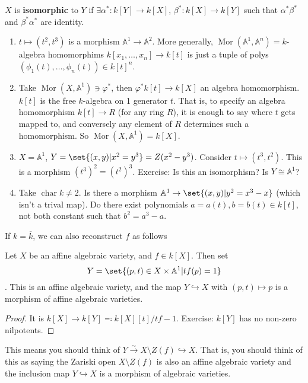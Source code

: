 \documentclass{article}
\newcommand{\A}{\mathbb{A}}
\DeclareMathOperator{\chara}{char}
\DeclareMathOperator{\Mor}{Mor}
\begin{document}
\begin{defi}[Isomorphic]
    $X$ is \textbf{isomorphic} to $Y$ if $\exists \alpha^*: k[Y] \to k[X]$, $\beta^*: k[X] \to k[Y]$ such that $\alpha^* \beta^*$ and $\beta^* \alpha^*$ are identity.
\end{defi}
\begin{eg}
    \begin{enumerate}[label=(\roman*)]
        \item $t \mapsto (t^2, t^3)$ is a morphism $\A^1 \to \A^2$.
            More generally, $\Mor(\A^1, \A^n) = k$-algebra homomorphims $k[x_1, \dotsc, x_n] \to k[t]$ is just a tuple of polys $(\phi_1(t), \dotsc, \phi_n(t)) \in k[t]^n$.
        \item Take $\Mor(X, \A^1) \ni \varphi^*$, then $\varphi^* k[t] \to k[X]$ an algebra homomorphism. $k[t]$ is the free $k$-algebra on 1 generator $t$.
            That is, to specify an algebra homomorphism $k[t] \to R$ (for any ring $R$), it is enough to say where $t$ gets mapped to, and conversely any element of $R$ determines such a homomorphism.
            So $\Mor(X, \A^1) = k[X]$.
        \item $X = \A^1$, $Y = \set{(x, y) | x^2 = y^3} = Z(x^2 - y^3)$. Consider $t \mapsto (t^3, t^2)$. This is a morphism $(t^3)^2 = (t^2)^3$.
            Exercise: Is this an isomorphism? Is $Y \cong \A^1$?
        \item Take $\chara k \neq 2$. Is there a morphism $\A^1 \to \set{(x, y) | y^2 = x^3 - x}$ (which isn't a trival map).
            Do there exist polynomials $a = a(t), b=b(t) \in k[t]$, not both constant such that $b^2 = a^3 - a$.
    \end{enumerate}
\end{eg}


If $k = \overline{k}$, we can also reconstruct $f$ as follows

\begin{prop}
    Let $X$ be an affine algebraic variety, and $f \in k[X]$.  Then set \begin{equation*}Y = \set{(p, t) \in X \times \A^1 | t f(p) = 1}\end{equation*}.
    This is an affine algebraic variety, and the map $Y \hookrightarrow X$ with $(p, t) \mapsto p$ is a morphism of affine algebraic varieties.
\end{prop}
\begin{proof}
    It is $k[X] \to k[Y] \eqqcolon k[X][t]/tf-1$. Exercise: $k[Y]$ has no non-zero nilpotents.
\end{proof}
This means you should think of $Y \xrightarrow{\sim} X \setminus Z(f) \hookrightarrow X$.
That is, you should think of this as saying the Zariski open $X \setminus Z(f)$ is also an affine algebraic variety and the inclusion map $Y \hookrightarrow X$ is a morphism of algebraic varieties.
\end{document}
